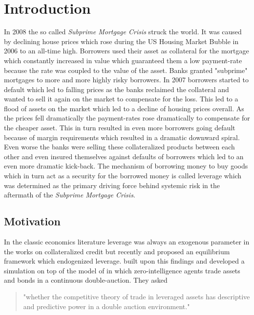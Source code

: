 \documentclass[Bachelorarbeit.tex]{subfiles}
\begin{document}
\chapter{Introduction}
In 2008 the so called \textit{Subprime Mortgage Crisis} struck the world. It was caused by declining house prices which rose during the US Housing Market Bubble in 2006 to an all-time high. Borrowers used their asset as collateral for the mortgage which constantly increased in value which guaranteed them a low payment-rate because the rate was coupled to the value of the asset. 
\medskip
Banks granted "subprime" mortgages to more and more highly risky borrowers. In 2007 borrowers started to default which led to falling prices as the banks reclaimed the collateral and wanted to sell it again on the market to compensate for the loss. This led to a flood of assets on the market which led to a decline of housing prices overall. As the prices fell dramatically the payment-rates rose dramatically to compensate for the cheaper asset. This in turn resulted in even more borrowers going default because of margin requirements which resulted in a dramatic downward spiral. Even worse the banks were selling these collateralized products between each other and even insured themselves against defaults of borrowers which led to an even more dramatic kick-back.
\medskip
The mechanism of borrowing money to buy goods which in turn act as a security for the borrowed money is called leverage which was determined as the primary driving force behind systemic risk in the aftermath of the \textit{Subprime Mortgage Crisis}.

\section{Motivation}
In the classic economics literature leverage was always an exogenous parameter in the works on collateralized credit but recently \cite{Geanakoplos2009} and \cite{GeanakoplosZame2014} proposed an equilibrium framework which endogenized leverage. \cite{Breuer2015} built upon this findings and developed a simulation on top of the model of \cite{Geanakoplos2009} in which zero-intelligence agents trade assets and bonds in a continuous double-auction. They asked 

\begin{quote}
"whether the competitive theory of trade in leveraged assets has descriptive and predictive power in a double auction environment."
\end{quote}
\end{document}
